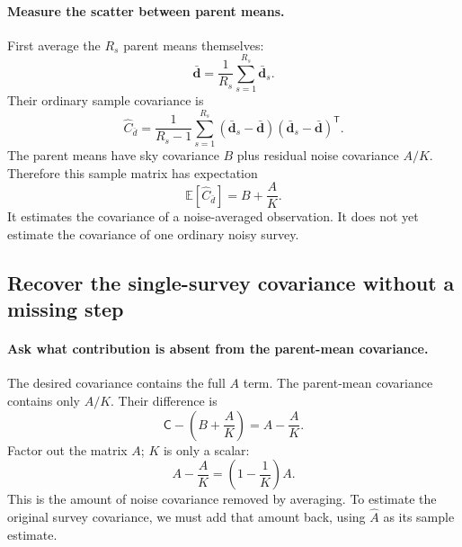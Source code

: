 \documentclass[11pt]{article}
\newcommand{\Cov}{\mathsf{C}}
\newcommand{\T}{^{\mathsf{T}}}
\newcommand{\E}{\mathbb{E}}
\begin{document}
\paragraph{Measure the scatter between parent means.}
First average the $R_s$ parent means themselves:
\begin{equation}
 \bar{\boldsymbol d}=\frac1{R_s}\sum_{s=1}^{R_s}\bar{\boldsymbol d}_s.
\end{equation}
Their ordinary sample covariance is
\begin{equation}
 \widehat C_{\bar d}=\frac1{R_s-1}\sum_{s=1}^{R_s}
  (\bar{\boldsymbol d}_s-\bar{\boldsymbol d})
  (\bar{\boldsymbol d}_s-\bar{\boldsymbol d})\T.
\end{equation}
The parent means have sky covariance $B$ plus residual noise covariance
$A/K$. Therefore this sample matrix has expectation
\begin{equation}
 \E[\widehat C_{\bar d}]=B+\frac{A}{K}.
 \label{eq:parent-mean-cov}
\end{equation}
It estimates the covariance of a noise-averaged observation. It does not
yet estimate the covariance of one ordinary noisy survey.

\subsection{Recover the single-survey covariance without a missing step}
\paragraph{Ask what contribution is absent from the parent-mean covariance.}
The desired covariance contains the full $A$ term. The parent-mean
covariance contains only $A/K$. Their difference is
\begin{equation}
 \Cov-\left(B+\frac AK\right)=A-\frac AK.
\end{equation}
Factor out the matrix $A$; $K$ is only a scalar:
\begin{equation}
 A-\frac AK=\left(1-\frac1K\right)A.
\end{equation}
This is the amount of noise covariance removed by averaging. To estimate
the original survey covariance, we must add that amount back, using
$\widehat A$ as its sample estimate.
\end{document}

